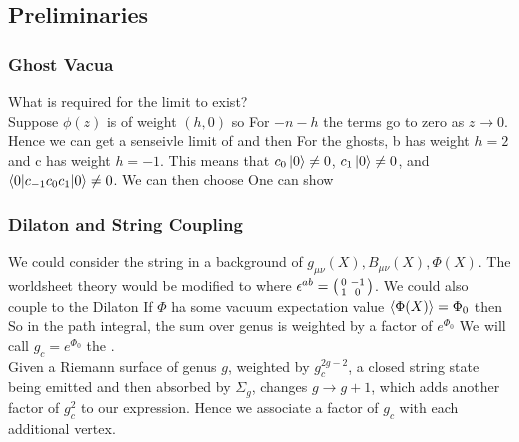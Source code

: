 \documentclass{article}
\begin{document}
\subsection{Preliminaries}

\subsubsection*{Ghost Vacua}
What is required for the limit 
to exist? \\
Suppose $\phi(z)$ is of weight $(h,0)$ so
For $-n-h$ the terms go to zero as $z \to 0$. Hence we can get a senseivle limit of 
and then 
For the ghosts, b has weight $h=2$ and c has weight $h = -1$. This means that $c_0\ket{0} \neq 0$, $c_1 \ket{0} \neq 0$, and $\braket{0 | c_{-1} c_0 c_1 | 0}\neq 0$. We can then choose 
One can show 


\subsubsection*{Dilaton and String Coupling}
We could consider the string in a background of $g_{\mu\nu}(X), B_{\mu\nu}(X), \Phi(X)$. The worldsheet theory would be modified to 
where $\epsilon^{ab} = \begin{psmallmatrix} 0 & -1 \\ 1 & 0 \end{psmallmatrix}$. We could also couple to the Dilaton
If $\Phi$ ha some vacuum expectation value $\braket{\Phi(X)} = \Phi_0$ then
So in the path integral, the sum over genus is weighted by a factor of $e^{\Phi_0}$
We will call $g_c = e^{\Phi_0}$ the . \\
Given a Riemann surface of genus $g$, weighted by $g_c^{2g-2}$, a closed string state being emitted and then absorbed by $\Sigma_g$, changes $g \to g+1$, which adds another factor of $g_c^2$ to our expression. Hence we associate a factor of $g_c$ with each additional vertex. 
\end{document}
